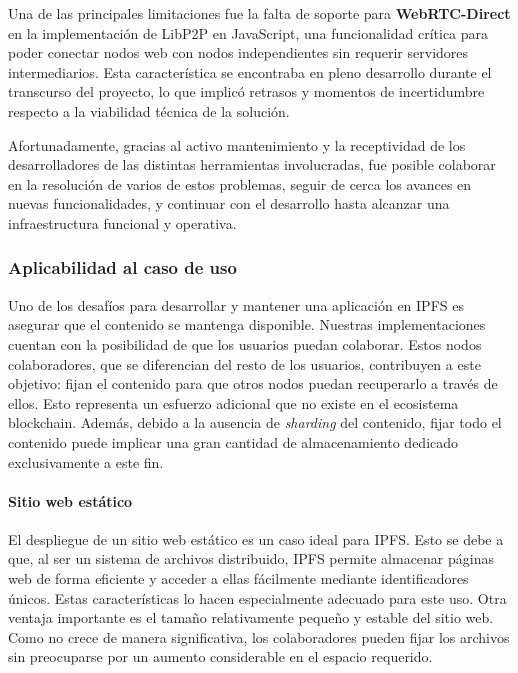 Una de las principales limitaciones fue la falta de soporte para \textbf{WebRTC-Direct} en la implementación de LibP2P en JavaScript, una funcionalidad crítica para poder conectar nodos web con nodos independientes sin requerir servidores intermediarios. Esta característica se encontraba en pleno desarrollo durante el transcurso del proyecto, lo que implicó retrasos y momentos de incertidumbre respecto a la viabilidad técnica de la solución.

Afortunadamente, gracias al activo mantenimiento y la receptividad de los desarrolladores de las distintas herramientas involucradas, fue posible colaborar en la resolución de varios de estos problemas, seguir de cerca los avances en nuevas funcionalidades, y continuar con el desarrollo hasta alcanzar una infraestructura funcional y operativa.

\subsubsection{Aplicabilidad al caso de uso}

Uno de los desafíos para desarrollar y mantener una aplicación en IPFS es asegurar que el contenido se mantenga disponible. Nuestras implementaciones cuentan con la posibilidad de que los usuarios puedan colaborar. Estos nodos colaboradores, que se diferencian del resto de los usuarios, contribuyen a este objetivo: fijan el contenido para que otros nodos puedan recuperarlo a través de ellos. Esto representa un esfuerzo adicional que no existe en el ecosistema blockchain. Además, debido a la ausencia de \textit{sharding} del contenido, fijar todo el contenido puede implicar una gran cantidad de almacenamiento dedicado exclusivamente a este fin.

\paragraph{Sitio web estático}

El despliegue de un sitio web estático es un caso ideal para IPFS. Esto se debe a que, al ser un sistema de archivos distribuido, IPFS permite almacenar páginas web de forma eficiente y acceder a ellas fácilmente mediante identificadores únicos. Estas características lo hacen especialmente adecuado para este uso.
Otra ventaja importante es el tamaño relativamente pequeño y estable del sitio web. Como no crece de manera significativa, los colaboradores pueden fijar los archivos sin preocuparse por un aumento considerable en el espacio requerido.


